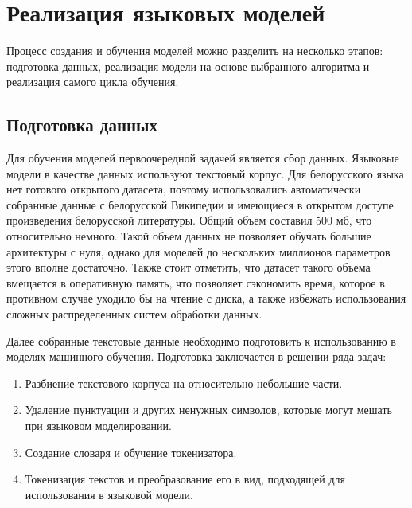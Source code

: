 
\section{Реализация языковых моделей}
\label{sec:arch}

Процесс создания и обучения моделей можно разделить на несколько этапов: подготовка данных, реализация модели на основе выбранного алгоритма и реализация самого цикла обучения. 

\subsection{Подготовка данных}
\label{sec:arch:data}

Для обучения моделей первоочередной задачей является сбор данных. Языковые модели в качестве данных используют текстовый корпус. Для белорусского языка нет готового открытого датасета, поэтому использовались автоматически собранные данные с белорусской Википедии и имеющиеся в открытом доступе произведения белорусской литературы. Общий объем составил 500 мб, что относительно немного. Такой объем данных не позволяет обучать большие архитектуры с нуля, однако для моделей до нескольких миллионов параметров этого вполне достаточно. Также стоит отметить, что датасет такого объема вмещается в оперативную память, что позволяет сэкономить время, которое в противном случае уходило бы на чтение с диска, а также избежать использования сложных распределенных систем обработки данных.

Далее собранные текстовые данные необходимо подготовить к использованию в моделях машинного обучения. Подготовка заключается в решении ряда задач:

\begin{enumerate}
	\item Разбиение текстового корпуса на относительно небольшие части.
	\item Удаление пунктуации и других ненужных символов, которые могут мешать при языковом моделировании.
	\item Создание словаря и обучение токенизатора.
	\item Токенизация текстов и преобразование его в вид, подходящей для использования в языковой модели.
\end{enumerate}

